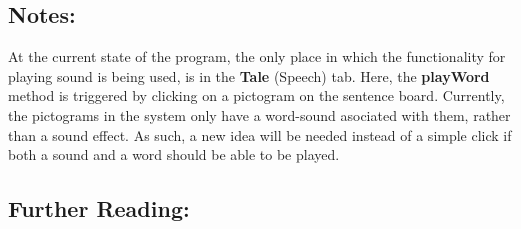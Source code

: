 \subsection*{Notes:}
At the current state of the program, the only place in which the functionality for playing sound is being used, is in the \textbf{Tale} (Speech) tab. Here, the \textbf{playWord} method is triggered by clicking on a pictogram on the sentence board.\newline
Currently, the pictograms in the system only have a word-sound asociated with them, rather than a sound effect. As such, a new idea will be needed instead of a simple click if both a sound and a word should be able to be played.

\subsection*{Further Reading:}